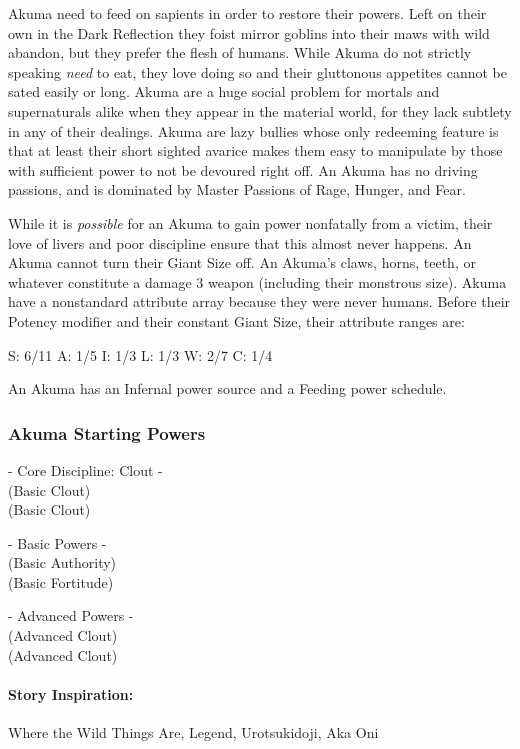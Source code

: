 Akuma need to feed on sapients in order to restore their powers. Left on their own in the Dark Reflection they foist mirror goblins into their maws with wild abandon, but they prefer the flesh of humans. While Akuma do not strictly speaking \textit{need} to eat, they love doing so and their gluttonous appetites cannot be sated easily or long. Akuma are a huge social problem for mortals and supernaturals alike when they appear in the material world, for they lack subtlety in any of their dealings. Akuma are lazy bullies whose only redeeming feature is that at least their short sighted avarice makes them easy to manipulate by those with sufficient power to not be devoured right off. An Akuma has no driving passions, and is dominated by Master Passions of Rage, Hunger, and Fear.

While it is \textit{possible} for an Akuma to gain power nonfatally from a victim, their love of livers and poor discipline ensure that this almost never happens. An Akuma cannot turn their Giant Size off. An Akuma's claws, horns, teeth, or whatever constitute a damage 3 weapon (including their monstrous size). Akuma have a nonstandard attribute array because they were never humans. Before their Potency modifier and their constant Giant Size, their attribute ranges are:

S: 6/11 A: 1/5 I: 1/3 L: 1/3 W: 2/7 C: 1/4

An Akuma has an Infernal power source and a Feeding power schedule.

\subsubsection{Akuma Starting Powers}

\hspace{\parindent} - Core Discipline: Clout -\\
 (Basic Clout)\\
 (Basic Clout)

- Basic Powers -\\
 (Basic Authority)\\
 (Basic Fortitude)

- Advanced Powers -\\
 (Advanced Clout)\\
 (Advanced Clout)

\paragraph{Story Inspiration:} Where the Wild Things Are, Legend, Urotsukidoji, Aka Oni

